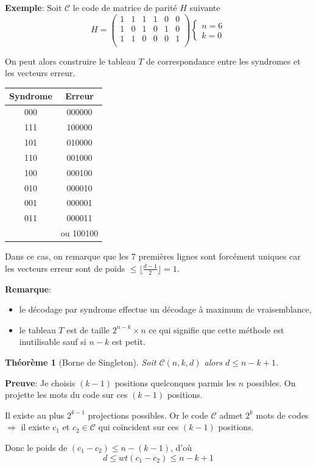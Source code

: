 \documentclass[a4paper,10pt,twocolumn]{article}
\theoremstyle{break}
\newcommand{\code}[1]{\mathcal{#1}}
\newcommand{\C}{\code{C}}
\newtheorem{myth}{Théorème}
\newenvironment{note}[1]
{\textbf{#1}:}
{}
\newenvironment{myproof}
{\begin{note}{Preuve}}
{\end{note}}
\newenvironment{remarque}
{\begin{note}{Remarque}}
{\end{note}}
\newenvironment{exemple}
{\begin{note}{Exemple}}
{\end{note}}
\begin{document}
\begin{exemple}
 Soit $\C$ le code de matrice de parité $H$ suivante 
 $$ H = \begin{pmatrix}
1 & 1 & 1 & 1 & 0 & 0 \\
1 & 0 & 1 & 0 & 1 & 0 \\
1 & 1 & 0 & 0 & 0 & 1 \\
\end{pmatrix} 
\left\{\begin{array}{l}n=6\\k=0\end{array}\right.$$

On peut alors construire le tableau $T$ de correspondance entre les syndromes et les vecteurs erreur.
\begin{center}
\begin{tabular}{|c|c|}
 \hline Syndrome & Erreur \\ \hline
 000 & 000000 \\
 111 & 100000 \\
 101 & 010000 \\
 110 & 001000 \\
 100 & 000100 \\
 010 & 000010 \\
 001 & 000001\\
 011 & 000011\\
 & ou 100100 \\
\hline
\end{tabular}
\end{center}
Dans ce cas, on remarque que les 7 premières lignes sont forcément uniques car les vecteurs erreur sont de poids $ \le \lfloor \frac{d-1}{2} \rfloor = 1$.
\end{exemple}

\begin{remarque}
 \begin{itemize}
 \item le décodage par syndrome effectue un décodage à maximum de vraisemblance,
 \item le tableau $T$ est de taille $2^{n-k} \times n$ ce qui signifie que cette méthode est inutilisable sauf si $n-k$ est petit.
\end{itemize}
\end{remarque}


\begin{myth}[Borne de Singleton]
 Soit $\C(n,k,d)$ alors $d \le n - k + 1$.
\end{myth}

\begin{myproof}
 Je choisis $(k-1)$ positions quelconques parmis les $n$ possibles. On projette les mots du code sur ces $(k-1)$ positions.

 Il existe au plus $2^{k-1}$ projections possibles. Or le code $\C$ admet $2^k$ mots de codes 
$\Rightarrow$ il existe $c_1$ et $c_2 \in \C$ qui coïncident sur ces $(k-1)$ positions.

Donc le poids de $(c_1 - c_2) \le n - (k-1)$, d'où 
$$ d \le wt(c_1 - c_2) \le n - k + 1 $$
\end{myproof}
\end{document}
